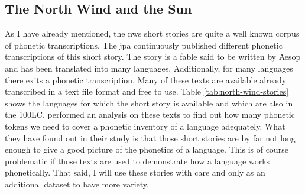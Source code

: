 
\subsection{The North Wind and the Sun}
\label{nws}
As I have already mentioned, the \ac{nws} short stories are quite a well known corpus of phonetic transcriptions. The \ac{jpa} continuously published different phonetic transcriptions of this short story. The story is a fable said to be written by Aesop and has been translated into many languages. Additionally, for many languages there exits a phonetic transcription. Many of these texts are available already transcribed in a text file format and free to use. Table \ref{tab:north-wind-stories} shows the languages for which the short story is available and which are also in the 100LC. \citet{baird_evans_greenhill_2021} performed an analysis on these texts to find out how many phonetic tokens we need to cover a phonetic inventory of a language adequately. What they have found out in their study is that those short stories are by far not long enough to give a good picture of the phonetics of a language. This is of course problematic if those texts are used to demonstrate how a language works phonetically. That said, I will use these stories with care and only as an additional dataset to have more variety.

